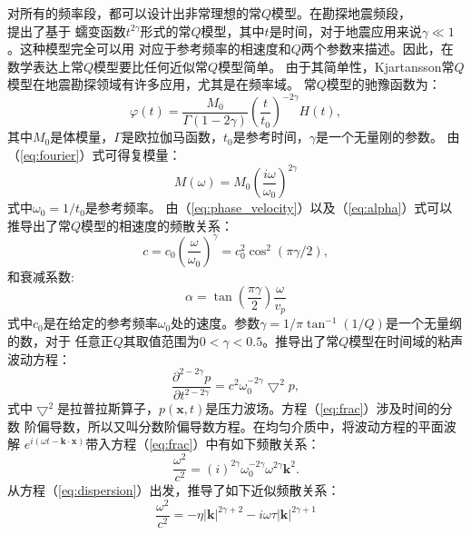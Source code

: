 对所有的频率段，都可以设计出非常理想的常$Q$模型。在勘探地震频段， \\
提出了基于
蠕变函数$t^{2\gamma}$形式的常$Q$模型，其中$t$是时间，对于地震应用来说$\gamma\ll1$。这种模型完全可以用
对应于参考频率的相速度和$Q$两个参数来描述。因此，在数学表达上常$Q$模型要比任何近似常$Q$模型简单。
由于其简单性，Kjartansson常$Q$模型在地震勘探领域有许多应用，尤其是在频率域。
常$Q$模型的驰豫函数为：
\begin{equation}
	\varphi(t)=\frac{M_0}{\Gamma(1-2\gamma)}(\frac{t}{t_0})^{-2\gamma}H(t),
\end{equation}
其中$M_0$是体模量，$\Gamma$是欧拉伽马函数，$t_0$是参考时间，$\gamma$是一个无量刚的参数。
由（\ref{eq:fourier}）式可得复模量：
\begin{equation}
	M(\omega)=M_0(\frac{i\omega}{\omega_0})^{2\gamma}
\end{equation}
式中$\omega_0=1/t_0$是参考频率。
由（\ref{eq:phase_velocity}）以及（\ref{eq:alpha}）式可以推导出了常$Q$模型的相速度的频散关系：
\begin{equation}
	c=c_0(\frac{\omega}{\omega_0})^\gamma=c_0^2\cos^2(\pi\gamma/2),
\end{equation}
和衰减系数:
\begin{equation}
	\alpha=\tan(\frac{\pi\gamma}{2})\frac{\omega}{v_p}
\end{equation}
式中$c_0$是在给定的参考频率$\omega_0$处的速度。参数$\gamma=1/\pi\tan^{-1}(1/Q)$是一个无量纲的数，对于
任意正$Q$其取值范围为$0<\gamma<0.5$。推导出了常$Q$模型在时间域的粘声波动方程：
\begin{equation}
	\frac{\partial^{2-2\gamma}p}{\partial t^{2-2\gamma}}=c^2\omega_0^{-2\gamma}\bigtriangledown^2p,
	\label{eq:frac}
\end{equation}
式中$\bigtriangledown^2$是拉普拉斯算子，$p(\mathbf{x},t)$是压力波场。方程（\ref{eq:frac}）涉及时间的分数
阶偏导数，所以又叫分数阶偏导数方程。在均匀介质中，将波动方程的平面波解
$e^{i(\omega t-\mathbf{k}\cdot\mathbf{x})}$带入方程（\ref{eq:frac}）中有如下频散关系：
\begin{equation}
	\frac{\omega^2}{c^2}=(i)^{2\gamma}\omega_0^{-2\gamma}\omega^{2\gamma}\mathbf{k}^2.
	\label{eq:dispersion}
\end{equation}
 从方程（\ref{eq:dispersion}）出发，推导了如下近似频散关系：
\begin{equation}
	\frac{\omega^2}{c^2}=-\eta|\mathbf{k}|^{2\gamma+2}-i\omega\tau|\mathbf{k}|^{2\gamma+1}
	\label{eq:dispersion1}
\end{equation}
